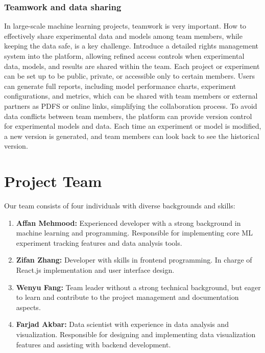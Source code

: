 \documentclass[12pt]{article}
\begin{document}
\subsubsection{Teamwork and data sharing}
In large-scale machine learning projects, teamwork is very important. How to effectively share experimental data and models among team members, while keeping the data safe, is a key challenge. Introduce a detailed rights management system into the platform, allowing refined access controls when experimental data, models, and results are shared within the team. Each project or experiment can be set up to be public, private, or accessible only to certain members. Users can generate full reports, including model performance charts, experiment configurations, and metrics, which can be shared with team members or external partners as PDFS or online links, simplifying the collaboration process. To avoid data conflicts between team members, the platform can provide version control for experimental models and data. Each time an experiment or model is modified, a new version is generated, and team members can look back to see the historical version.

\section{Project Team}

Our team consists of four individuals with diverse backgrounds and skills:

\begin{enumerate}
    \item \textbf{Affan Mehmood:} Experienced developer with a strong background in machine learning and programming. Responsible for implementing core ML experiment tracking features and data analysis tools.
    
    \item \textbf{Zifan Zhang:} Developer with skills in frontend programming. In charge of React.js implementation and user interface design.
    
    \item \textbf{Wenyu Fang:} Team leader without a strong technical background, but eager to learn and contribute to the project management and documentation aspects.
    
    \item \textbf{Farjad Akbar:} Data scientist with experience in data analysis and visualization. Responsible for designing and implementing data visualization features and assisting with backend development.
\end{enumerate}
\end{document}
